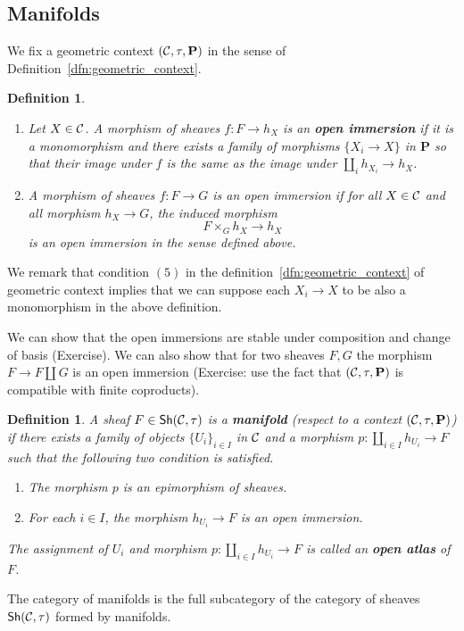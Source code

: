 \documentclass{tufte-book} %
\numberwithin{dummy}{section}
\newtheorem{dfn}[thm]{Definition}
\newcommand{\calc}{{\cal C}}
\newcommand{\lrta}{\longrightarrow}
\newcommand{\ssh}{\mathsf{Sh}}
\newcommand{\bfp}{\mathbf{P}}
\begin{document}
\subsection{Manifolds}
We fix a geometric context $(\calc,\tau,\bfp)$ in the sense of Definition~\ref{dfn:geometric_context}.
\begin{dfn}\ 
\begin{enumerate}
\item Let $X\in \calc$. A morphism of sheaves $f:F\lrta h_X$ is an \textbf{open immersion} if it is a monomorphism and there exists a family of morphisms $\{X_i\lrta X\}$ in $\bfp$ so that their image under $f$ is the same as the image under $\coprod_i h_{X_i}\lrta h_X$.
\item A morphism of sheaves $f:F\lrta G$ is an open immersion if for all $X\in\calc$ and all morphism $h_X\lrta G$, the induced morphism 
$$
F\times_G h_X\lrta h_X
$$
is an open immersion in the sense defined above.
\end{enumerate}
\end{dfn}
We remark that condition $(5)$ in the definition~\ref{dfn:geometric_context} of geometric context implies that we can suppose each $X_i\lrta X$ to be also a monomorphism in the above definition.

We can show that the open immersions are stable under composition and change of basis (Exercise). We can also show that for two sheaves $F,G$ the morphism $F\lrta F\coprod G$ is an open immersion (Exercise: use the fact that $(\calc,\tau,\bfp)$ is compatible with finite coproducts).

\begin{dfn}
A sheaf $F\in \ssh(\calc,\tau)$ is a \textbf{manifold} (respect to a context $(\calc,\tau,\bfp)$) if there exists a family of objects $\{U_i\}_{i\in I}$ in $\calc$ and a morphism $p:\coprod_{i\in I}h_{U_i}\lrta F$ such that the following two condition is satisfied.
\begin{enumerate}
\item The morphism $p$ is an epimorphism of sheaves.
\item For each $i\in I$, the morphism $h_{U_i}\lrta F$ is an open immersion.
\end{enumerate}
The assignment of $U_i$ and morphism $p:\coprod_{i\in I} h_{U_i}\lrta F$ is called an \textbf{open atlas} of $F$.
\end{dfn}
The category of manifolds is the full subcategory of the category of sheaves $\ssh(\calc,\tau)$ formed by manifolds.
\end{document}
